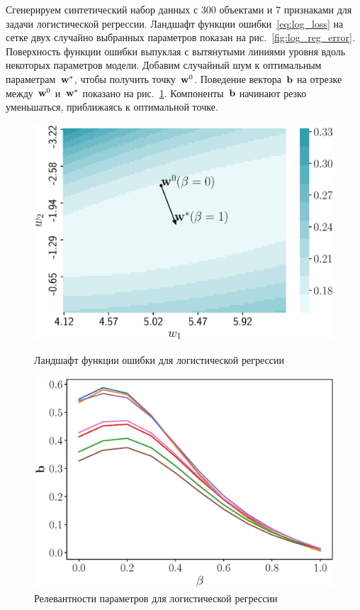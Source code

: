 Сгенерируем синтетический набор данных с 300 объектами и 7 признаками для задачи логистической регрессии. 
Ландшафт функции ошибки~\eqref{eq:log_loss} на сетке двух случайно выбранных параметров показан на рис.~\ref{fig:log_reg_error}.
Поверхность функции ошибки выпуклая с вытянутыми линиями уровня вдоль некоторых параметров модели.
Добавим случайный шум к оптимальным параметрам~$\mathbf{w}^*$, чтобы получить точку~$\mathbf{w}^0$. Поведение вектора~$\mathbf{b}$ на отрезке между~$\mathbf{w}^0$ и~$\mathbf{w}^*$ показано на рис.~\ref{fig:log_reg_b_wrt_beta}.
Компоненты~$\mathbf{b}$ начинают резко уменьшаться, приближаясь к оптимальной точке.
\begin{figure}
	\centering
	\begin{minipage}{.47\textwidth}
		\centering
		\includegraphics[width=\linewidth]{figs/ch3/log_reg_error}
		\caption{Ландшафт функции ошибки для логистической регрессии}
		\label{fig:log_reg_error}
	\end{minipage}%
	\begin{minipage}{.47\textwidth}
		\centering
		\includegraphics[width=\linewidth]{figs/ch3/log_reg_b_wrt_beta}
		\caption{Релевантности параметров для логистической регрессии}
		\label{fig:log_reg_b_wrt_beta}
	\end{minipage}
\end{figure}

